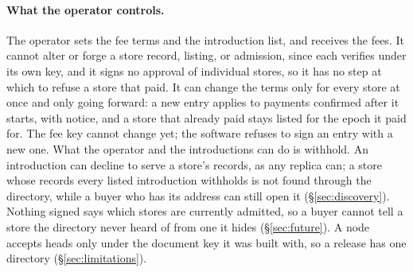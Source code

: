 \paragraph{What the operator controls.} The operator sets the fee terms and the introduction list, and receives the fees. It cannot alter or forge a store record, listing, or admission, since each verifies under its own key, and it signs no approval of individual stores, so it has no step at which to refuse a store that paid. It can change the terms only for every store at once and only going forward: a new entry applies to payments confirmed after it starts, with notice, and a store that already paid stays listed for the epoch it paid for. The fee key cannot change yet; the software refuses to sign an entry with a new one. What the operator and the introductions can do is withhold. An introduction can decline to serve a store's records, as any replica can; a store whose records every listed introduction withholds is not found through the directory, while a buyer who has its address can still open it (\S\ref{sec:discovery}). Nothing signed says which stores are currently admitted, so a buyer cannot tell a store the directory never heard of from one it hides (\S\ref{sec:future}). A node accepts heads only under the document key it was built with, so a release has one directory (\S\ref{sec:limitations}).

